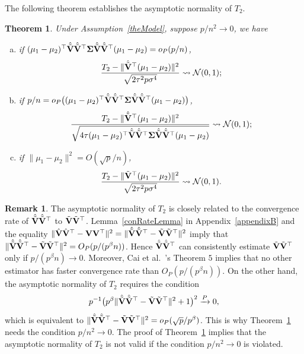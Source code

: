 \documentclass[times,sort&compress,3p]{elsarticle}
\theoremstyle{plain}
\newtheorem{theorem}{\quad\quad Theorem}
\theoremstyle{definition}
\newtheorem{remark}{\quad\quad Remark}
\theoremstyle{remark}
\begin{document}
The following theorem establishes the asymptotic normality of $T_2$.
\begin{theorem}\label{myPanpan}
    Under Assumption~\ref{theModel},
suppose $p/n^2\to 0$,
    we have
    \begin{enumerate}[(a)]
        \item
 if $(\mu_1-\mu_2)^\top  \hat{\tilde{\mathbf{V}}}\hat{\tilde{\mathbf{V}}}^\top  \boldsymbol{\Sigma}\hat{\tilde{\mathbf{V}}}\hat{\tilde{\mathbf{V}}}^\top  (\mu_1-\mu_2)=o_P(p/n)$,
\begin{equation*}
    \frac{T_2-\|\hat{\tilde{\mathbf{V}}}^\top (\mu_1-\mu_2)\|^2}{\sqrt{2\tau^2 p\sigma^4}}\rightsquigarrow \mathcal{N}(0,1);
\end{equation*}
        \item
 if $p/n=o_P\big((\mu_1-\mu_2)^\top  \hat{\tilde{\mathbf{V}}}\hat{\tilde{\mathbf{V}}}^\top  \boldsymbol{\Sigma}\hat{\tilde{\mathbf{V}}}\hat{\tilde{\mathbf{V}}}^\top  (\mu_1-\mu_2)\big)$,
\begin{equation*}
    \frac{T_2-\|\hat{\tilde{\mathbf{V}}}^\top (\mu_1-\mu_2)\|^2}{\sqrt{4\tau (\mu_1-\mu_2)^\top  \hat{\tilde{\mathbf{V}}}\hat{\tilde{\mathbf{V}}}^\top  \boldsymbol{\Sigma}\hat{\tilde{\mathbf{V}}}\hat{\tilde{\mathbf{V}}}^\top  (\mu_1-\mu_2)}}\rightsquigarrow \mathcal{N}(0,1);
\end{equation*}
        \item
 if $\|\mu_1-\mu_2\|^2=O({\sqrt{p}}/{n})$,
\begin{equation*}
    \frac{T_2-\|\tilde{\mathbf{V}}^\top (\mu_1-\mu_2)\|^2}{\sqrt{2\tau^2 p\sigma^4}}\rightsquigarrow \mathcal{N}(0,1).
\end{equation*}
    \end{enumerate}
\end{theorem} 
\begin{remark}
The asymptotic normality of $T_2$ is closely related to the convergence rate of $\hat{\tilde{\mathbf{V}}}\hat{\tilde{\mathbf{V}}}^\top $ to $\tilde{\mathbf{V}}\tilde{\mathbf{V}}^\top $.
    Lemma~\ref{conRateLemma} in Appendix~\ref{appendixB} and the equality $\|\hat{\mathbf{V}}\hat{\mathbf{V}}^\top  -\mathbf{V} \mathbf{V}^\top \|^2=\|\hat{\tilde{\mathbf{V}}}\hat{\tilde{\mathbf{V}}}^\top  -\tilde{\mathbf{V}} \tilde{\mathbf{V}}^\top \|^2$ imply that 
    $\|\hat{\tilde{\mathbf{V}}}\hat{\tilde{\mathbf{V}}}^\top  -\tilde{\mathbf{V}} \tilde{\mathbf{V}}^\top \|^2=O_P(p/(p^{\beta}n))$.
    Hence $\hat{\tilde{\mathbf{V}}}\hat{\tilde{\mathbf{V}}}^\top $ can consistently estimate $\tilde{\mathbf{V}}\tilde{\mathbf{V}}^\top $ only if $p/(p^{\beta}n)\to 0$.
    Moreover, Cai {\rm et al.}~\cite{Cai2012Sparse}'s Theorem $5$ implies that no other estimator has faster convergence rate than $O_P(p/(p^{\beta}n))$.
    On the other hand, the asymptotic normality of $T_2$ requires the condition
    $$
    p^{-1}\big(p^{\beta}\|\hat{\tilde{\mathbf{V}}}\hat{\tilde{\mathbf{V}}}^\top  -\tilde{\mathbf{V}} \tilde{\mathbf{V}}^\top \|^2+1\big)^2\xrightarrow{P} 0,
    $$
    which is equivalent to $\|\hat{\tilde{\mathbf{V}}}\hat{\tilde{\mathbf{V}}}^\top  -\tilde{\mathbf{V}} \tilde{\mathbf{V}}^\top \|^2=o_P(\sqrt{p}/p^{\beta})$.
    This is why Theorem~\ref{myPanpan} needs the condition  $p/n^2\to 0$.
The proof of Theorem~\ref{myPanpan} implies that the asymptotic normality of $T_2$ is not valid if the condition $p/n^2\to 0$ is violated.
\end{remark}
\end{document}
